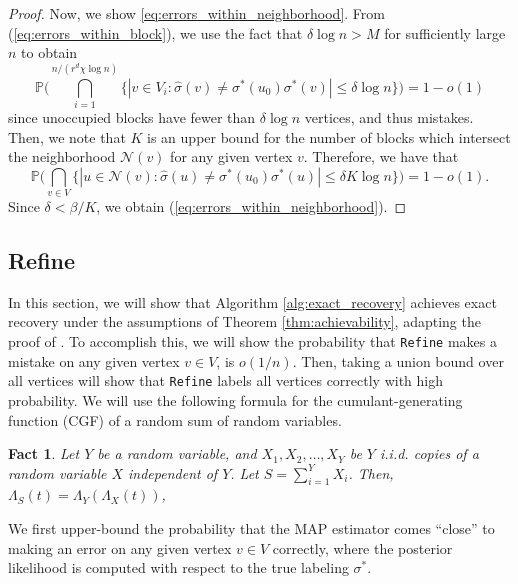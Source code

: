 \documentclass{article}
\renewcommand{\P}{\mathbb{P}}
\newcommand{\1}{\mathbbm{1}}
\newcommand{\calN}{\mathcal{N}}
\theoremstyle{definition}
\theoremstyle{plain}
\newtheorem{fact}{Fact}
\begin{document}
\begin{proof}
    Now, we show \eqref{eq:errors_within_neighborhood}. From (\ref{eq:errors_within_block}), we use the fact that $\delta \log n > M$ for sufficiently large $n$ to obtain 
    \begin{equation*}
        \P\bigg( \bigcap_{i = 1}^{n/(r^d \chi \log n)} \Big\{ |v \in V_i: \hat{\sigma}(v) \neq \sigma^*(u_0) \sigma^*(v) | \leq \delta \log n \Big\} \bigg) = 1 - o(1)
    \end{equation*}
    since unoccupied blocks have fewer than $\delta \log n$ vertices, and thus mistakes. Then, we note that $K$ is an upper bound for the number of blocks which intersect the neighborhood $\calN(v)$ for any given vertex $v$. Therefore, we have that
    \begin{equation*}
        \P\bigg( \bigcap_{v \in V} \{|u \in \calN(v): \hat{\sigma}(u) \neq \sigma^*(u_0)\sigma^*(u)| \leq \delta K \log n\} \bigg) = 1 - o(1).
    \end{equation*}
    Since $\delta < \beta / K$, we obtain (\ref{eq:errors_within_neighborhood}).
\end{proof}




\subsection{Refine}
\label{subsec:refine}
In this section, we will show that Algorithm \ref{alg:exact_recovery} achieves exact recovery under the assumptions of Theorem \ref{thm:achievability}, adapting the proof of \cite{Gaudio+2025}. To accomplish this, we will show the probability that \texttt{Refine} makes a mistake on any given vertex $v\in V$, is $o(1/n)$. Then, taking a union bound over all vertices will show that \texttt{Refine} labels all vertices correctly with high probability. We will use the following formula for the cumulant-generating function (CGF) of a random sum of random variables.

\begin{fact}
\label{fact:CGF_formula}
    Let $Y$ be a random variable, and $X_1, X_2, \ldots, X_Y$ be $Y$ i.i.d. copies of a random variable $X$ independent of $Y$. Let $S = \sum_{i=1}^Y X_i$. Then, $\Lambda_S(t) = \Lambda_Y(\Lambda_X(t))$,
\end{fact}

We first upper-bound the probability that the MAP estimator comes ``close'' to making an error on any given vertex $v \in V$ correctly, where the posterior likelihood is computed with respect to the true labeling $\sigma^*$.
\end{document}
